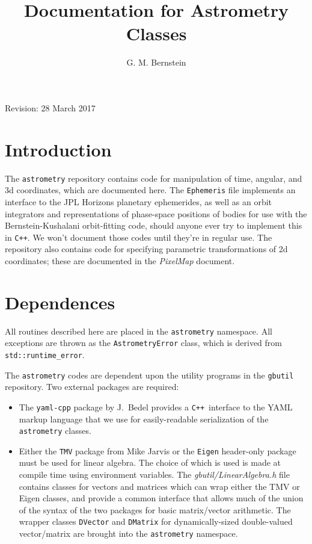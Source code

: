 \documentclass[11pt,preprint,flushrt]{aastex}
\newcommand{\cpp}{\texttt{C++}}
\begin{document}
\title{Documentation for Astrometry Classes}

\author{G. M. Bernstein}

\hspace*{\fill}Revision: 28 March 2017

\section{Introduction}
The \texttt{astrometry} repository contains code for manipulation of time, angular, and 3d coordinates, which are documented here.  The \texttt{Ephemeris} file implements an interface to the JPL Horizons planetary ephemerides, as  well as an orbit integrators and representations of phase-space positions of bodies for use with the Bernstein-Kushalani orbit-fitting code, should anyone ever try to implement this in \cpp.  We won't document those codes until they're in regular use.
The repository also contains code for specifying parametric transformations of 2d coordinates; these are documented in the \textit{PixelMap} document.

\section{Dependences}
All routines described here are placed in the {\tt astrometry} namespace.  All exceptions are thrown as the {\tt AstrometryError} class, which is derived from {\tt std::runtime\_error}.  

The \texttt{astrometry} codes are dependent upon the utility programs in the \texttt{gbutil} repository.  Two external packages are required:
\begin{itemize}
\item The \texttt{yaml-cpp} package by J.~Bedel provides a \cpp\ interface to the YAML markup language that we use for easily-readable serialization of the \texttt{astrometry} classes.
\item Either the \texttt{TMV} package from Mike Jarvis or the \texttt{Eigen} header-only package must be used for linear algebra.  The choice of which is used is made at compile time using environment variables.  The \textit{gbutil/LinearAlgebra.h} file contains classes for vectors and matrices which can wrap either the TMV or Eigen classes, and provide a common interface that allows much of the union of the syntax of the two packages for basic matrix/vector arithmetic.  The wrapper classes \texttt{DVector} and \texttt{DMatrix} for dynamically-sized double-valued vector/matrix are brought into the \texttt{astrometry} namespace.
\end{itemize}
\end{document}

